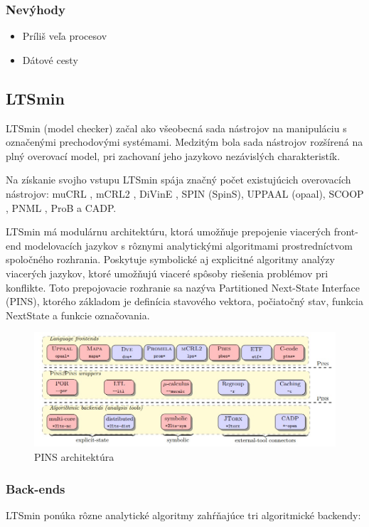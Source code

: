 \subsubsection{Nevýhody}

\begin{itemize}
	\item Príliš veľa procesov
	\item Dátové cesty
\end{itemize}

\subsection{LTSmin}
LTSmin (model checker) začal ako všeobecná sada nástrojov na manipuláciu s označenými prechodovými systémami. 
Medzitým bola sada nástrojov rozšírená na plný overovací model, 
pri zachovaní jeho jazykovo nezávislých charakteristík.

Na získanie svojho vstupu LTSmin spája značný počet existujúcich overovacích 
nástrojov: muCRL , mCRL2 , DiVinE , SPIN (SpinS), UPPAAL (opaal), SCOOP , PNML , ProB a CADP.

LTSmin má modulárnu architektúru, ktorá umožňuje prepojenie viacerých front-end modelovacích 
jazykov s rôznymi analytickými algoritmami prostredníctvom spoločného rozhrania.
Poskytuje symbolické aj explicitné algoritmy analýzy viacerých jazykov, 
ktoré umožňujú viaceré spôsoby riešenia problémov pri konflikte.
Toto prepojovacie rozhranie sa nazýva Partitioned Next-State Interface (PINS), 
ktorého základom je definícia stavového vektora, počiatočný stav, 
funkcia NextState a funkcie označovania.

\begin{figure}[ht]
\centerline{\includegraphics[width=1\textwidth]{images/ltsmin}}
\caption[PINS architektúra]{PINS architektúra}
\label{obr:pins}
\end{figure}

\subsubsection{Back-ends}
LTSmin ponúka rôzne analytické algoritmy zahŕňajúce tri algoritmické backendy:

